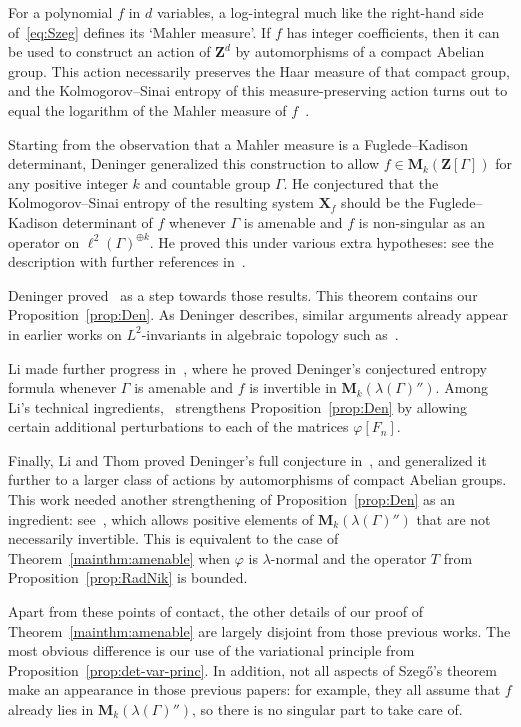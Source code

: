\documentclass[12pt,a4paper]{article}
\numberwithin{equation}{section}
\theoremstyle{remark}
\newcommand{\bs}[1]{\boldsymbol{#1}}
\newcommand{\bbZ}{\mathbf{Z}}
\newcommand{\rmM}{\mathbf{M}}
\newcommand{\G}{\Gamma}
\renewcommand{\phi}{\varphi}
\renewcommand{\l}{\lambda}
\begin{document}
For a polynomial $f$ in $d$ variables, a log-integral much like the right-hand side of~\eqref{eq:Szeg} defines its `Mahler measure'.  If $f$ has integer coefficients, then it can be used to construct an action of $\bbZ^d$ by automorphisms of a compact Abelian group.  This action necessarily preserves the Haar measure of that compact group, and the Kolmogorov--Sinai entropy of this measure-preserving action turns out to equal the logarithm of the Mahler measure of $f$~\cite{LindSchWar90}.

Starting from the observation that a Mahler measure is a Fuglede--Kadison determinant, Deninger generalized this construction to allow $f \in \rmM_k(\bbZ[\G])$ for any positive integer $k$ and countable group $\G$.  He conjectured that the Kolmogorov--Sinai entropy of the resulting system $\bs{X}_f$ should be the Fuglede--Kadison determinant of $f$ whenever $\G$ is amenable and $f$ is non-singular as an operator on $\ell^2(\G)^{\oplus k}$. He proved this under various extra hypotheses: see the description with further references in~\cite{Den09}.

Deninger proved~\cite[Thm. 3.2]{Den06} as a step towards those results.  This theorem contains our Proposition~\ref{prop:Den}.  As Deninger describes, similar arguments already appear in earlier works on $L^2$-invariants in algebraic topology such as~\cite{Luc94,DodMat98,Schi01}.

Li made further progress in~\cite{Li12}, where he proved Deninger's conjectured entropy formula whenever $\G$ is amenable and $f$ is invertible in $\rmM_k(\l(\G)'')$.  Among Li's technical ingredients,~\cite[Corollary 7.2]{Li12} strengthens Proposition~\ref{prop:Den} by allowing certain additional perturbations to each of the matrices $\phi[F_n]$.

Finally, Li and Thom proved Deninger's full conjecture in~\cite{LiTho14}, and generalized it further to a larger class of actions by automorphisms of compact Abelian groups.  This work needed another strengthening of Proposition~\ref{prop:Den} as an ingredient: see~\cite[Thm. 1.4]{LiTho14}, which allows positive elements of $\rmM_k(\l(\G)'')$ that are not necessarily invertible.  This is equivalent to the case of Theorem~\ref{mainthm:amenable} when $\phi$ is $\l$-normal and the operator $T$ from Proposition~\ref{prop:RadNik} is bounded.

Apart from these points of contact, the other details of our proof of Theorem~\ref{mainthm:amenable} are largely disjoint from those previous works.  The most obvious difference is our use of the variational principle from Proposition~\ref{prop:det-var-princ}.  In addition, not all aspects of Szeg\H{o}'s theorem make an appearance in those previous papers: for example, they all assume that $f$ already lies in $\rmM_k(\l(\G)'')$, so there is no singular part to take care of.
\end{document}
